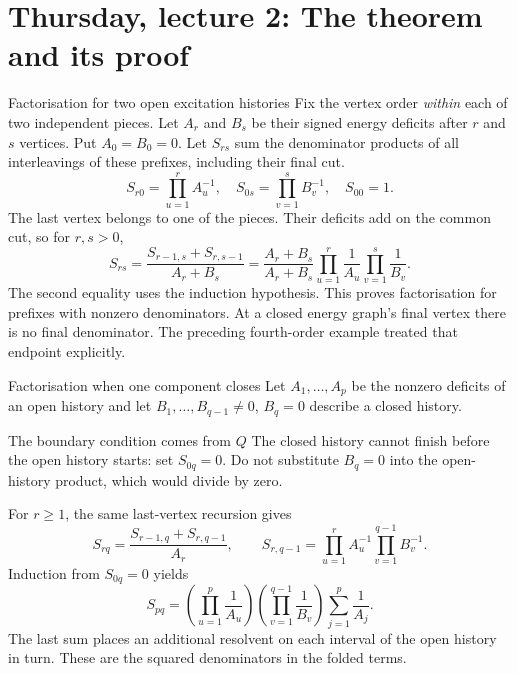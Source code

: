 \documentclass[aspectratio=169,10pt]{beamer}
\begin{document}
\section[Thursday 2: The proof]{Thursday, lecture 2: The theorem and its proof}

\begin{frame}{Factorisation for two open excitation histories}
Fix the vertex order \emph{within} each of two independent pieces. Let $A_r$ and $B_s$ be their signed energy deficits after $r$ and $s$ vertices. Put $A_0=B_0=0$. Let $S_{rs}$ sum the denominator products of all interleavings of these prefixes, including their final cut.
\[
 S_{r0}=\prod_{u=1}^r A_u^{-1},\quad S_{0s}=\prod_{v=1}^s B_v^{-1},\quad S_{00}=1.
\]
The last vertex belongs to one of the pieces. Their deficits add on the common cut, so for $r,s>0$,
\[
 S_{rs}=\frac{S_{r-1,s}+S_{r,s-1}}{A_r+B_s}
 =\frac{A_r+B_s}{A_r+B_s}
   \prod_{u=1}^r\frac1{A_u}\prod_{v=1}^s\frac1{B_v}.
\]
The second equality uses the induction hypothesis. This proves factorisation for prefixes with nonzero denominators. At a closed energy graph's final vertex there is no final denominator. The preceding fourth-order example treated that endpoint explicitly.
\end{frame}

\begin{frame}{Factorisation when one component closes}
\small
Let $A_1,\ldots,A_p$ be the nonzero deficits of an open history and let $B_1,\ldots,B_{q-1}\ne0$, $B_q=0$ describe a closed history.
\begin{block}{The boundary condition comes from $Q$}
The closed history cannot finish before the open history starts: set $S_{0q}=0$. Do not substitute $B_q=0$ into the open-history product, which would divide by zero.
\end{block}
For $r\ge1$, the same last-vertex recursion gives
\[
 S_{rq}=\frac{S_{r-1,q}+S_{r,q-1}}{A_r},\qquad
 S_{r,q-1}=\prod_{u=1}^r A_u^{-1}\prod_{v=1}^{q-1}B_v^{-1}.
\]
Induction from $S_{0q}=0$ yields
\[
 \boxed{S_{pq}=\left(\prod_{u=1}^{p}\frac1{A_u}\right)
 \left(\prod_{v=1}^{q-1}\frac1{B_v}\right)
 \sum_{j=1}^{p}\frac1{A_j}.}
\]
The last sum places an additional resolvent on each interval of the open history in turn. These are the squared denominators in the folded terms.
\end{frame}
\end{document}
